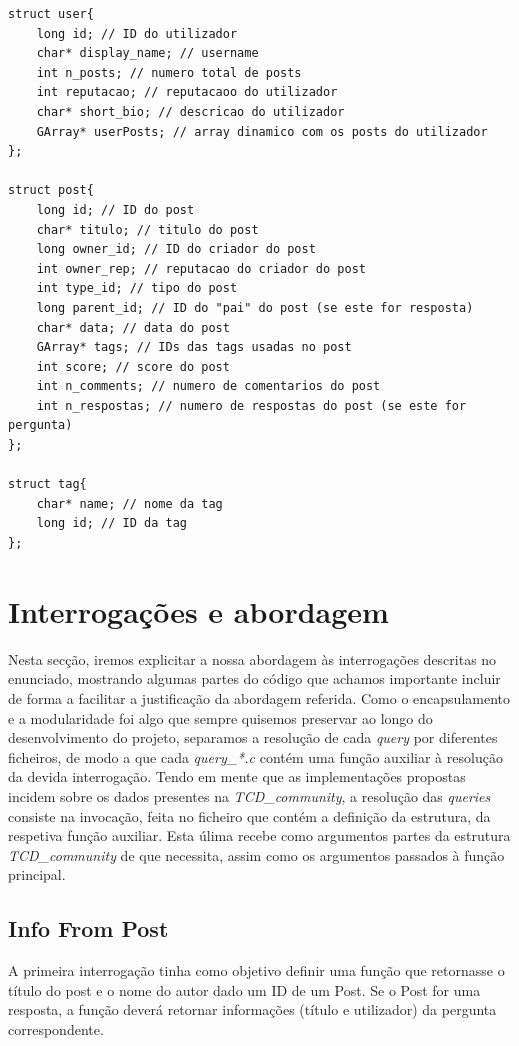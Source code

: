 \documentclass[a4paper, 11pt, oneside]{article}
\begin{document}
\begin{lstlisting}[caption=Definição de estruturas internas]
struct user{
	long id; // ID do utilizador
	char* display_name; // username
	int n_posts; // numero total de posts
	int reputacao; // reputacaoo do utilizador
	char* short_bio; // descricao do utilizador 
	GArray* userPosts; // array dinamico com os posts do utilizador
};

struct post{
	long id; // ID do post
	char* titulo; // titulo do post
	long owner_id; // ID do criador do post
	int owner_rep; // reputacao do criador do post
	int type_id; // tipo do post
	long parent_id; // ID do "pai" do post (se este for resposta)
	char* data; // data do post
	GArray* tags; // IDs das tags usadas no post
	int score; // score do post
	int n_comments; // numero de comentarios do post
	int n_respostas; // numero de respostas do post (se este for pergunta)
};

struct tag{
	char* name; // nome da tag
	long id; // ID da tag
};
\end{lstlisting}

\newpage
\section{Interrogações e abordagem}
\label{queries}
Nesta secção, iremos explicitar a nossa abordagem às interrogações descritas no enunciado, mostrando algumas partes do código que achamos importante incluir de forma a facilitar a justificação da abordagem referida. Como o encapsulamento e a modularidade foi algo que sempre quisemos preservar ao longo do desenvolvimento do projeto, separamos a resolução de cada \textit{query} por diferentes ficheiros, de modo a que cada \textit{query\_*.c} contém uma função auxiliar à resolução da devida interrogação. Tendo em mente que as implementações propostas incidem sobre os dados presentes na \textit{TCD\_community}, a resolução das \textit{queries} consiste na invocação, feita no ficheiro que contém a definição da estrutura, da respetiva função auxiliar. Esta úlima recebe como argumentos partes da estrutura \textit{TCD\_community} de que necessita, assim como os argumentos passados à função principal.

\subsection{Info From Post}
A primeira interrogação tinha como objetivo definir uma função que retornasse o título do post e o nome do autor dado um ID de um Post. Se o Post for uma resposta, a função deverá retornar informações (título e utilizador) da pergunta correspondente.
\end{document}

